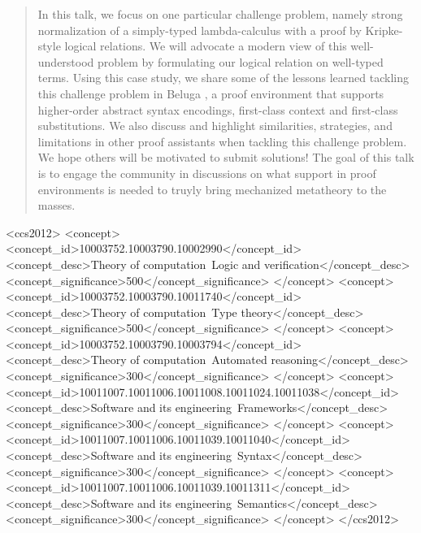 \documentclass[sigplan,screen]{acmart}\settopmatter{}
\begin{document}
\begin{abstract}
In this talk, we
focus on one particular challenge problem, namely strong normalization
of a simply-typed lambda-calculus with a proof by Kripke-style logical
relations. We will advocate a modern view of this well-understood
problem by formulating our logical relation on well-typed terms. 
Using this case study, we share some
of the lessons learned tackling this challenge problem in Beluga \cite{PientkaC15}, a
proof environment that supports higher-order abstract syntax
encodings, first-class context and first-class substitutions. We also
discuss and highlight similarities, strategies, and limitations in
other proof assistants {when tackling this challenge problem.}
 \newline\indent
We hope others will be motivated to submit solutions! The goal of this
talk is to engage the community in discussions on what support in
proof environments is needed to truyly bring mechanized metatheory to
the masses.
\end{abstract}


 \begin{CCSXML}
<ccs2012>
<concept>
<concept_id>10003752.10003790.10002990</concept_id>
<concept_desc>Theory of computation~Logic and verification</concept_desc>
<concept_significance>500</concept_significance>
</concept>
<concept>
<concept_id>10003752.10003790.10011740</concept_id>
<concept_desc>Theory of computation~Type theory</concept_desc>
<concept_significance>500</concept_significance>
</concept>
<concept>
<concept_id>10003752.10003790.10003794</concept_id>
<concept_desc>Theory of computation~Automated reasoning</concept_desc>
<concept_significance>300</concept_significance>
</concept>
<concept>
<concept_id>10011007.10011006.10011008.10011024.10011038</concept_id>
<concept_desc>Software and its engineering~Frameworks</concept_desc>
<concept_significance>300</concept_significance>
</concept>
<concept>
<concept_id>10011007.10011006.10011039.10011040</concept_id>
<concept_desc>Software and its engineering~Syntax</concept_desc>
<concept_significance>300</concept_significance>
</concept>
<concept>
<concept_id>10011007.10011006.10011039.10011311</concept_id>
<concept_desc>Software and its engineering~Semantics</concept_desc>
<concept_significance>300</concept_significance>
</concept>
</ccs2012>
\end{CCSXML}
\end{document}
